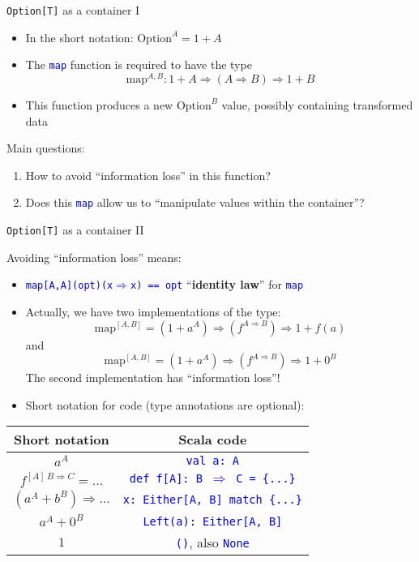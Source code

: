 \documentclass[english]{beamer}
\providecommand{\tabularnewline}{\\}
\begin{document}
\begin{frame}{\texttt{Option{[}T{]}} as a container I}

\begin{itemize}
\item In the short notation: $\text{Option}^{A}=1+A$
\item The \texttt{\textcolor{blue}{\footnotesize{}map}} function is required
to have the type
\[
\text{map}^{A,B}:1+A\Rightarrow\left(A\Rightarrow B\right)\Rightarrow1+B
\]
\item This function produces a new $\text{Option}^{B}$ value, possibly
containing transformed data
\end{itemize}
Main questions:
\begin{enumerate}
\item How to avoid ``information loss'' in this function?
\item Does this \texttt{\textcolor{blue}{\footnotesize{}map}} allow us to
``manipulate values within the container''?
\end{enumerate}
\end{frame}

\begin{frame}{\texttt{Option{[}T{]}} as a container II}

Avoiding ``information loss'' means:
\begin{itemize}
\item \texttt{\textcolor{blue}{\footnotesize{}map{[}A,A{]}(opt)(x$\Rightarrow$x)
== opt}} \textendash{} ``\textbf{identity law}'' for \texttt{\textcolor{blue}{\footnotesize{}map}}{\footnotesize \par}
\item Actually, we have two implementations of the type: 
\[
\text{map}^{[A,B]}=(1+a^{A})\Rightarrow(f^{A\Rightarrow B})\Rightarrow1+f(a)
\]
and
\[
\text{map}^{[A,B]}=(1+a^{A})\Rightarrow(f^{A\Rightarrow B})\Rightarrow1+0^{B}
\]
The second implementation has ``information loss''!
\item Short notation for code (type annotations are optional):
\end{itemize}
\begin{center}
\begin{tabular}{|c|c|}
\hline 
\textbf{Short notation} &
\textbf{Scala code}\tabularnewline
\hline 
\hline 
$a^{A}$ &
\texttt{\textcolor{blue}{\footnotesize{}val a: A}}\tabularnewline
\hline 
$f^{[A]\,B\Rightarrow C}=...$ &
\texttt{\textcolor{blue}{\footnotesize{}def f{[}A{]}: B $\Rightarrow$
C = \{...\}}}\tabularnewline
\hline 
$(a^{A}+b^{B})\Rightarrow...$ &
\texttt{\textcolor{blue}{\footnotesize{}x: Either{[}A, B{]} match
\{...\}}}\tabularnewline
\hline 
$a^{A}+0^{B}$ &
\texttt{\textcolor{blue}{\footnotesize{}Left(a):\ Either{[}A, B{]}}}\tabularnewline
\hline 
$1$ &
\texttt{\textcolor{blue}{\footnotesize{}()}}, also \texttt{\textcolor{blue}{\footnotesize{}None}}\tabularnewline
\hline 
\end{tabular}
\par\end{center}

\end{frame}
\end{document}
